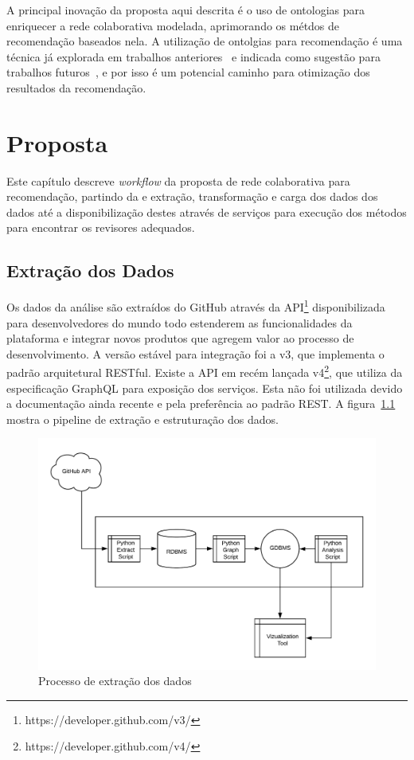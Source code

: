\documentclass[a4paper,12pt]{monografia}
\theoremstyle{plain}
\theoremstyle{definition}
\theoremstyle{remark}
\begin{document}
A principal inovação da proposta aqui descrita é o uso de ontologias para enriquecer a rede colaborativa modelada, aprimorando os métdos de recomendação baseados nela. A utilização de ontolgias para recomendação é uma técnica já explorada em trabalhos anteriores~\cite{middleton2001,middleton2004} e indicada como sugestão para trabalhos futuros~\cite{adomavicius2005}, e por isso é um potencial caminho para otimização dos resultados da recomendação.

\chapter{Proposta}\label{cha:proposta}

Este capítulo descreve \textit{workflow} da proposta de rede colaborativa para recomendação, partindo da e extração, transformação e carga dos dados dos dados até a disponibilização destes através de serviços para execução dos métodos para encontrar os revisores adequados.

\section{Extração dos Dados}

Os dados da análise são extraídos do GitHub através da API\footnote{https://developer.github.com/v3/} disponibilizada para desenvolvedores do mundo todo estenderem as funcionalidades da plataforma e integrar novos produtos que agregem valor ao processo de desenvolvimento. A versão estável para integração foi a v3, que implementa o padrão arquitetural RESTful\cite{fielding2002}. Existe a API em recém lançada v4\footnote{https://developer.github.com/v4/}, que utiliza da especificação GraphQL para exposição dos serviços. Esta não foi utilizada devido a documentação ainda recente e pela preferência ao padrão REST. A figura~\ref{fig:processo_extracao} mostra o pipeline de extração e estruturação dos dados.

\begin{figure}[!htbp]
 \includegraphics[width=\textwidth]{processo_extracao}
 \caption{Processo de extração dos dados}\label{fig:processo_extracao}
\end{figure}
\end{document}
